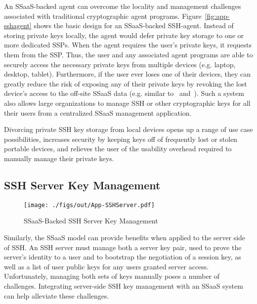 An SSaaS-backed agent can overcome the locality and management
challenges associated with traditional cryptographic agent
programs. Figure~\ref{fig:app-sshagent} shows the basic design for an
SSaaS-backed SSH-agent. Instead of storing private keys locally, the
agent would defer private key storage to one or more dedicated
SSPs. When the agent requires the user's private keys, it requests
them from the SSP. Thus, the user and any associated agent programs
are able to securely access the necessary private keys from multiple
devices (e.g. laptop, desktop, tablet). Furthermore, if the user ever
loses one of their devices, they can greatly reduce the risk of
exposing any of their private keys by revoking the lost device's
access to the off-site SSaaS data (e.g. similar to~\cite{geambasu2011}
and~\cite{tang2012}). Such a system also allows large organizations to
manage SSH or other cryptographic keys for all their users from a
centralized SSaaS management application.

Divorcing private SSH key storage from local devices opens up a range
of use case possibilities, increases security by keeping keys off of
frequently lost or stolen portable devices, and relieves the user of
the usability overhead required to manually manage their private keys.

\subsection{SSH Server Key Management}

\begin{figure}[t]
  \centering
  \texttt{[image: ./figs/out/App-SSHServer.pdf]}
  \caption{SSaaS-Backed SSH Server Key Management}
  \label{fig:apps-sshserver}
\end{figure}

Similarly, the SSaaS model can provide benefits when applied to the
server side of SSH. An SSH server must manage both a server key pair,
used to prove the server's identity to a user and to bootstrap the
negotiation of a session key, as well as a list of user public keys
for any users granted server access. Unfortunately, managing both sets
of keys manually poses a number of challenges. Integrating server-side
SSH key management with an SSaaS system can help alleviate these
challenges.

